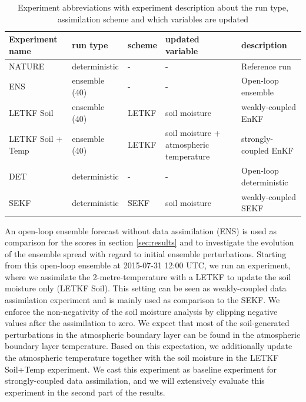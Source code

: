 \documentclass[HESSD, manuscript]{copernicus}
\begin{document}
\begin{table}[ht]
	\caption{
		Experiment abbreviations with experiment description about the run type, assimilation scheme and which variables are updated\label{tab:exp_desc}
	}
	\begin{tabular}{l|l|l|l|l}
		Experiment name & run type & scheme & updated variable & description\\
		\hline
		NATURE & deterministic & - & - & Reference run\\
		ENS & ensemble (40) & - & - & Open-loop ensemble\\
		LETKF Soil & ensemble (40) & LETKF & soil moisture & weakly-coupled EnKF\\
		LETKF Soil + Temp & ensemble (40) & LETKF & soil moisture + atmospheric temperature & strongly-coupled EnKF\\
		DET & deterministic & - & - & Open-loop deterministic\\
		SEKF & deterministic & SEKF & soil moisture & weakly-coupled SEKF
	\end{tabular}
\end{table}

An open-loop ensemble forecast without data assimilation (ENS) is used as comparison for the scores in section \ref{sec:results} and to investigate the evolution of the ensemble spread with regard to initial ensemble perturbations.
Starting from this open-loop ensemble at 2015-07-31 12:00 UTC, we run an experiment, where we assimilate the 2-metre-temperature with a LETKF to update the soil moisture only (LETKF Soil).
This setting can be seen as weakly-coupled data assimilation experiment and is mainly used as comparison to the SEKF.
We enforce the non-negativity of the soil moisture analysis by clipping negative values after the assimilation to zero.
We expect that most of the soil-generated perturbations in the atmospheric boundary layer can be found in the atmospheric boundary layer temperature.
Based on this expectation, we additionally update the atmospheric temperature together with the soil moisture in the LETKF Soil+Temp experiment.
We cast this experiment as baseline experiment for strongly-coupled data assimilation, and we will extensively evaluate this experiment in the second part of the results.
\end{document}
